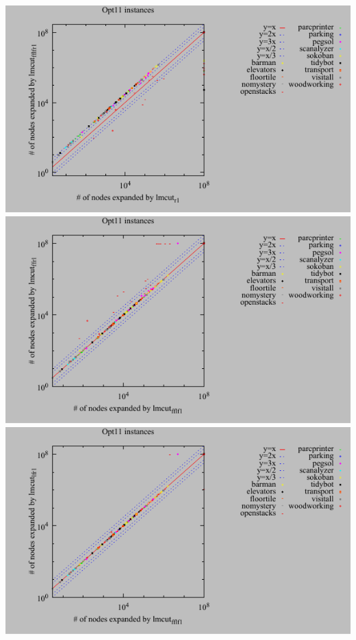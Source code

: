 \includegraphics{tables/opt11-expanded-lmcut_r-lmcut_fflfr.pdf}
\linebreak
\includegraphics{tables/opt11-expanded-lmcut_fflf-lmcut_ffr.pdf}
\linebreak
\includegraphics{tables/opt11-expanded-lmcut_fflf-lmcut_lfr.pdf}
\linebreak

